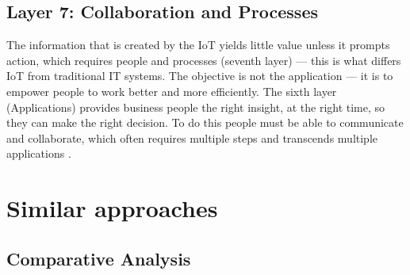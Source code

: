 \subsection{Layer 7: Collaboration and Processes}
\label{sec:iot-model-layer7}


The information that is created by the \acs{IoT} yields little value unless it prompts action, which requires people and processes (seventh layer) — this is what differs \acs{IoT} from traditional \acl{IT} systems. The objective is not the application — it is to empower people to work better and more efficiently. The sixth layer (Applications) provides business people the right insight, at the right time, so they can make the right decision. To do this people must be able to communicate and collaborate, which often requires multiple steps and transcends multiple applications \cite{Cisco2014}.

\section{Similar approaches}



\subsection{Comparative Analysis}

